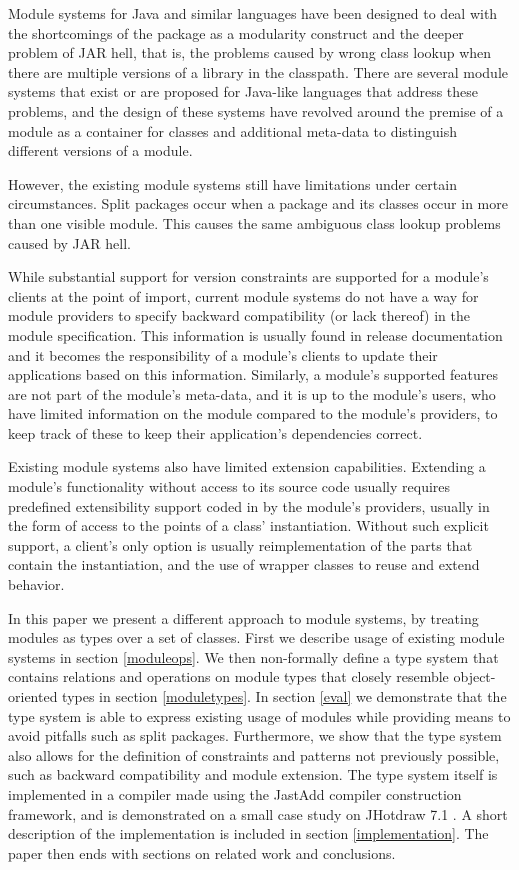 Module systems for Java and similar languages have been designed 
to deal with the shortcomings of the package as a modularity construct
and the deeper problem of JAR hell, that is, the problems caused
by wrong class lookup when there are multiple versions of a library
in the classpath. There are several module systems that exist or are
proposed for Java-like languages \cite{javajars, OSGi4, netassemblies, JSR294, JSR277}
that address these problems, and the design of these systems have
revolved around the premise of a module as a container for classes
and additional meta-data to distinguish different versions of a module.

However, the existing module systems still have limitations under 
certain circumstances. Split packages \cite{iJAMComments} occur when 
a package and its classes occur in more than one visible module. This
causes the same ambiguous class lookup problems caused by JAR hell.

While substantial support for version constraints are supported
for a module's clients at the point of import, current module 
systems do not have a way for module providers to specify backward 
compatibility (or lack thereof) in the module specification. 
This information is usually found in release documentation and 
it becomes the responsibility of a module's clients to update 
their applications based on this information. Similarly, a module's 
supported features are not part of the module's meta-data, and it 
is up to the module's users, who have limited 
information on the module compared to the module's providers, to 
keep track of these to keep their application's dependencies correct.

Existing module systems also have limited extension capabilities. Extending
a module's functionality without access to its source code usually 
requires predefined extensibility support coded in by the module's 
providers, usually in the form of access to the points of a class' 
instantiation. Without such explicit support, a client's only option
is usually reimplementation of the parts that contain the instantiation, 
and the use of wrapper classes to reuse and extend behavior.

In this paper we present a different approach to module systems, 
by treating modules as types over a set of classes. First we describe 
usage of existing module systems in section \ref{moduleops}. We then non-formally
define a type system that contains relations and operations on module types 
that closely resemble object-oriented types in section \ref{moduletypes}. 
In section \ref{eval} we demonstrate that the type
system is able to express existing usage of modules while providing means 
to avoid pitfalls such as split packages. 
Furthermore, we show that the type system also allows for the
definition of constraints and patterns not previously possible, such
as backward compatibility and module extension. The type system
itself is implemented in a compiler made using the JastAdd\cite{jastadd} compiler construction
framework, and is demonstrated on a small case study on JHotdraw 7.1 \cite{jhotdraw}.
A short description of the implementation is included in section \ref{implementation}.
The paper then ends with sections on related work and conclusions.
